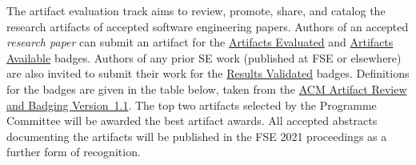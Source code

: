 \documentclass[twoside,a4paper]{refart}
\newcommand{\evaluated}{\protect\hyperlink{evaluated}{Artifacts Evaluated}\xspace}
\newcommand{\available}{\protect\hyperlink{available}{Artifacts Available}\xspace}
\newcommand{\validated}{\protect\hyperlink{validated}{Results Validated}\xspace}
\begin{document}
The artifact evaluation track aims to review, promote, share, and
catalog the research artifacts of accepted software engineering
papers. Authors of an accepted \emph{research paper} can submit an
artifact for the \evaluated and \available badges. Authors of any
prior SE work (published at FSE or elsewhere) are also invited to
submit their work for the \validated badges. Definitions for the
badges are given in the table below, taken from the
\href{https://www.acm.org/publications/policies/artifact-review-and-badging-current}{ACM
  Artifact Review and Badging Version~1.1}. The top two artifacts
selected by the Programme Committee will be awarded the best artifact
awards. All accepted abstracts documenting the artifacts will be
published in the FSE 2021 proceedings as a further form of
recognition.

\vspace{2em}
\hspace{-1.45\marginparwidth}
\end{document}
